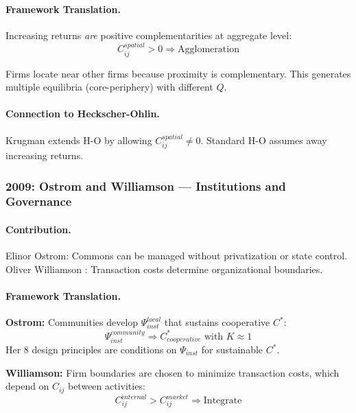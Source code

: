 \documentclass[12pt,a4paper]{article}
\begin{document}
\paragraph{Framework Translation.}
Increasing returns \emph{are} positive complementarities at aggregate level:
\begin{equation}
  C_{ij}^{spatial} > 0 \Rightarrow \text{Agglomeration}
\end{equation}

Firms locate near other firms because proximity is complementary.
This generates multiple equilibria (core-periphery) with different $Q$.

\paragraph{Connection to Heckscher-Ohlin.}
Krugman extends H-O by allowing $C_{ij}^{spatial} \neq 0$.
Standard H-O assumes away increasing returns.

\subsubsection{2009: Ostrom and Williamson --- Institutions and Governance}

\paragraph{Contribution.}
Elinor Ostrom: Commons can be managed without privatization or state control.
Oliver Williamson \citep{williamson1985}: Transaction costs determine organizational boundaries.

\paragraph{Framework Translation.}
\textbf{Ostrom:} Communities develop $\Psi_{inst}^{local}$ that sustains cooperative $C^*$:
\begin{equation}
  \Psi_{inst}^{community} \Rightarrow C^*_{cooperative} \text{ with } K \approx 1
\end{equation}
Her 8 design principles are conditions on $\Psi_{inst}$ for sustainable $C^*$.

\textbf{Williamson:} Firm boundaries are chosen to minimize transaction costs,
which depend on $C_{ij}$ between activities:
\begin{equation}
  C_{ij}^{internal} > C_{ij}^{market} \Rightarrow \text{Integrate}
\end{equation}
\end{document}
